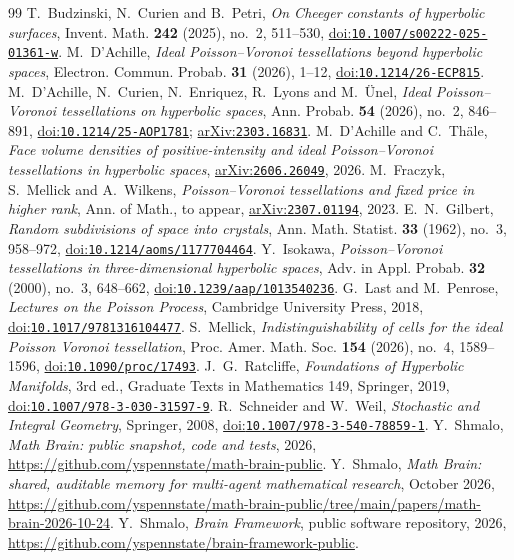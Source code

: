 \documentclass[11pt]{amsart}
\theoremstyle{remark}
\newcommand{\doi}[1]{\href{https://doi.org/#1}{doi:\nolinkurl{#1}}}
\newcommand{\arxiv}[1]{\href{https://arxiv.org/abs/#1}{arXiv:\nolinkurl{#1}}}
\begin{document}
\begin{thebibliography}{99}
 T.~Budzinski, N.~Curien and B.~Petri, \emph{On Cheeger constants of hyperbolic surfaces}, Invent.
Math. \textbf{242} (2025), no.~2, 511--530, \doi{10.1007/s00222-025-01361-w}.
 M.~D'Achille, \emph{Ideal Poisson--Voronoi tessellations beyond hyperbolic spaces}, Electron. Commun.
Probab. \textbf{31} (2026), 1--12, \doi{10.1214/26-ECP815}.
 M.~D'Achille, N.~Curien, N.~Enriquez, R.~Lyons and M.~\"Unel, \emph{Ideal Poisson--Voronoi tessellations
on hyperbolic spaces}, Ann. Probab. \textbf{54} (2026), no.~2, 846--891, \doi{10.1214/25-AOP1781};
\arxiv{2303.16831}.
 M.~D'Achille and C.~Th\"ale, \emph{Face volume densities of positive-intensity and ideal Poisson--Voronoi
tessellations in hyperbolic spaces}, \arxiv{2606.26049}, 2026.
 M.~Fraczyk, S.~Mellick and A.~Wilkens, \emph{Poisson--Voronoi tessellations and fixed price in higher rank},
Ann. of Math., to appear, \arxiv{2307.01194}, 2023.
 E.~N.~Gilbert, \emph{Random subdivisions of space into crystals}, Ann. Math. Statist. \textbf{33}
(1962), no.~3, 958--972, \doi{10.1214/aoms/1177704464}.
 Y.~Isokawa, \emph{Poisson--Voronoi tessellations in three-dimensional hyperbolic spaces}, Adv. in Appl.
Probab. \textbf{32} (2000), no.~3, 648--662, \doi{10.1239/aap/1013540236}.
 G.~Last and M.~Penrose, \emph{Lectures on the Poisson Process}, Cambridge University Press, 2018,
\doi{10.1017/9781316104477}.
 S.~Mellick, \emph{Indistinguishability of cells for the ideal Poisson Voronoi tessellation},
Proc. Amer. Math. Soc. \textbf{154} (2026), no.~4, 1589--1596, \doi{10.1090/proc/17493}.
 J.~G.~Ratcliffe, \emph{Foundations of Hyperbolic Manifolds}, 3rd ed., Graduate Texts in Mathematics
149, Springer, 2019, \doi{10.1007/978-3-030-31597-9}.
 R.~Schneider and W.~Weil, \emph{Stochastic and Integral Geometry}, Springer, 2008,
\doi{10.1007/978-3-540-78859-1}.
 Y.~Shmalo, \emph{Math Brain: public snapshot, code and tests}, 2026,
\url{https://github.com/yspennstate/math-brain-public}.
 Y.~Shmalo, \emph{Math Brain: shared, auditable memory for multi-agent mathematical research},
October 2026, \url{https://github.com/yspennstate/math-brain-public/tree/main/papers/math-brain-2026-10-24}.
 Y.~Shmalo, \emph{Brain Framework}, public software repository, 2026,
\url{https://github.com/yspennstate/brain-framework-public}.
\end{thebibliography}
\end{document}
